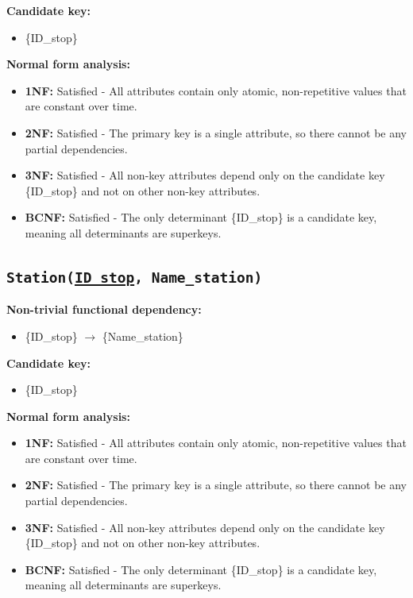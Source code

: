 \documentclass[a4paper, 12pt]{article}
\begin{document}
\textbf{Candidate key:}
\begin{itemize}
    \item \{ID\_stop\}
\end{itemize}

\textbf{Normal form analysis:}
\begin{itemize}
    \item \textbf{1NF:} Satisfied - All attributes contain only atomic, non-repetitive values that are constant over time.
    
    \item \textbf{2NF:} Satisfied - The primary key is a single attribute, so there cannot be any partial dependencies.
    
    \item \textbf{3NF:} Satisfied - All non-key attributes depend only on the candidate key \{ID\_stop\} and not on other non-key attributes.
    
    \item \textbf{BCNF:} Satisfied - The only determinant \{ID\_stop\} is a candidate key, meaning all determinants are superkeys.
\end{itemize}

\subsection{\texttt{{Station}(\underline{ID\_stop}, Name\_station)}}
\textbf{Non-trivial functional dependency:}
\begin{itemize}
    \item \{ID\_stop\} $\rightarrow$ \{Name\_station\}
\end{itemize}

\textbf{Candidate key:}
\begin{itemize}
    \item \{ID\_stop\}
\end{itemize}

\textbf{Normal form analysis:}
\begin{itemize}
    \item \textbf{1NF:} Satisfied - All attributes contain only atomic, non-repetitive values that are constant over time.
    
    \item \textbf{2NF:} Satisfied - The primary key is a single attribute, so there cannot be any partial dependencies.
    
    \item \textbf{3NF:} Satisfied - All non-key attributes depend only on the candidate key \{ID\_stop\} and not on other non-key attributes.
    
    \item \textbf{BCNF:} Satisfied - The only determinant \{ID\_stop\} is a candidate key, meaning all determinants are superkeys.
\end{itemize}
\end{document}
